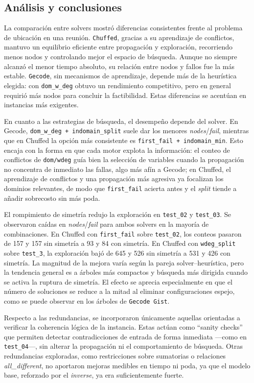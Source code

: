 
\subsection{Análisis y conclusiones}\label{sec:05-reunion-analisis-y-conclusiones}

La comparación entre solvers mostró diferencias consistentes frente al problema de ubicación en una reunión. \texttt{Chuffed}, gracias a su aprendizaje de conflictos, mantuvo un equilibrio eficiente entre propagación y exploración, recorriendo menos nodos y controlando mejor el espacio de búsqueda. Aunque no siempre alcanzó el menor tiempo absoluto, su relación entre nodos y fallos fue la más estable. \texttt{Gecode}, sin mecanismos de aprendizaje, depende más de la heurística elegida: con \texttt{dom\_w\_deg} obtuvo un rendimiento competitivo, pero en general requirió más nodos para concluir la factibilidad. Estas diferencias se acentúan en instancias más exigentes.

En cuanto a las estrategias de búsqueda, el desempeño depende del solver. En Gecode, \texttt{dom\_w\_deg + indomain\_split} suele dar los menores \emph{nodes}/\emph{fail}, mientras que en Chuffed la opción más consistente es \texttt{first\_fail + indomain\_min}. Esto encaja con la forma en que cada motor explota la información: el conteo de conflictos de \texttt{dom/wdeg} guía bien la selección de variables cuando la propagación no concentra de inmediato las fallas, algo más afín a Gecode; en Chuffed, el aprendizaje de conflictos y una propagación más agresiva ya focalizan los dominios relevantes, de modo que \texttt{first\_fail} acierta antes y el \emph{split} tiende a añadir sobrecosto sin más poda.

El rompimiento de simetría redujo la exploración en \texttt{test\_02} y \texttt{test\_03}. Se observaron caídas en \emph{nodes}/\emph{fail} para ambos solvers en la mayoría de combinaciones. En Chuffed con \texttt{first\_fail} sobre \texttt{test\_02}, los conteos pasaron de 157 y 157 sin simetría a 93 y 84 con simetría. En Chuffed con \texttt{wdeg\_split} sobre \texttt{test\_3}, la exploración bajó de 645 y 526 sin simetría a 531 y 426 con simetría. La magnitud de la mejora varía según la pareja solver–heurística, pero la tendencia general es a árboles más compactos y búsqueda más dirigida cuando se activa la ruptura de simetría. El efecto se aprecia especialmente en que el número de soluciones se reduce a la mitad al eliminar configuraciones espejo, como se puede observar en los árboles de \texttt{Gecode Gist}.

Respecto a las redundancias, se incorporaron únicamente aquellas orientadas a verificar la coherencia lógica de la instancia. Estas actúan como “sanity checks” que permiten detectar contradicciones de entrada de forma inmediata —como en \texttt{test\_04}—, sin alterar la propagación ni el comportamiento de búsqueda. Otras redundancias exploradas, como restricciones sobre sumatorias o relaciones \textit{all\_different}, no aportaron mejoras medibles en tiempo ni poda, ya que el modelo base, reforzado por el \textit{inverse}, ya era suficientemente fuerte.